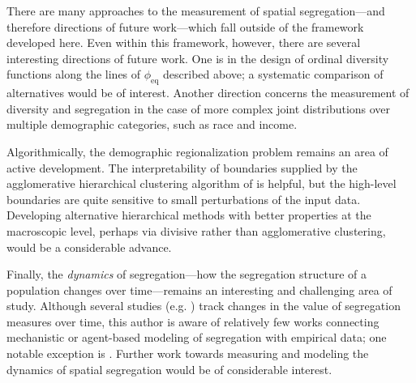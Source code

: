     There are many approaches to the measurement of spatial segregation---and therefore directions of future work---which fall outside of the framework developed here. 
    Even within this framework, however, there are several interesting directions of future work. 
    One is in the design of ordinal diversity functions along the lines of $\phi_{\mathrm{eq}}$ described above; a systematic comparison of alternatives would be of interest. 
    Another direction concerns the measurement of diversity and segregation in the case of more complex joint distributions over multiple demographic categories, such as race and income. 

    Algorithmically, the demographic regionalization problem remains an area of active development. 
    The interpretability of boundaries supplied by the agglomerative hierarchical clustering algorithm of \cite{chodrowStructureInformationSpatial2017} is helpful, but the high-level boundaries are quite sensitive to small perturbations of the input data. 
    Developing alternative hierarchical methods with better properties at the macroscopic level, perhaps via divisive rather than agglomerative clustering, would be a considerable advance. 

    Finally, the \emph{dynamics} of segregation---how the segregation structure of a population changes over time---remains an interesting and challenging area of study. 
    Although several studies (e.g. \cite{hwangRacializedReshufflingUrban2022}) track changes in the value of segregation measures over time, this author is aware of relatively few works connecting mechanistic or agent-based modeling of segregation with empirical data; one notable exception is \cite{benensonSchellingSpatiallyExplicit2009}. 
    Further work towards measuring and modeling the dynamics of spatial segregation would be of considerable interest. 
  

  
%
